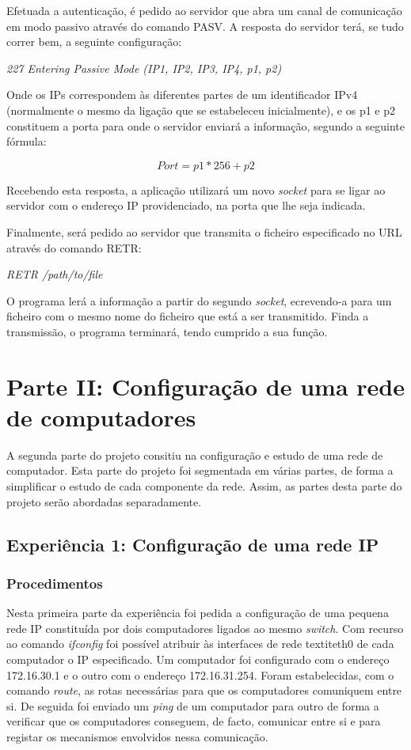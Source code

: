 \documentclass{article}
\begin{document}
Efetuada a autenticação, é pedido ao servidor que abra um canal de comunicação em modo passivo através do comando PASV. A resposta do servidor terá, se tudo correr bem, a seguinte configuração:

\textit{227 Entering Passive Mode (IP1, IP2, IP3, IP4, p1, p2)}

Onde os IPs correspondem às diferentes partes de um identificador IPv4 (normalmente o mesmo da ligação que se estabeleceu inicialmente), e os p1 e p2 constituem a porta para onde o servidor enviará a informação, segundo a seguinte fórmula:

\begin{equation}
Port = p1*256 + p2
\end{equation}

Recebendo esta resposta, a aplicação utilizará um novo \textit{socket} para se ligar ao servidor com o endereço IP providenciado, na porta que lhe seja indicada.

Finalmente, será pedido ao servidor que transmita o ficheiro especificado no URL através do comando RETR:

\textit{RETR /path/to/file}

O programa lerá a informação a partir do segundo \textit{socket}, ecrevendo-a para um ficheiro com o mesmo nome do ficheiro que está a ser transmitido. Finda a transmissão, o programa terminará, tendo cumprido a sua função.

\newpage

\section{Parte II: Configuração de uma rede de computadores}

A segunda parte do projeto consitiu na configuração e estudo de uma rede de computador. Esta parte do projeto foi segmentada em várias partes, de forma a simplificar o estudo de cada componente da rede. Assim, as partes desta parte do projeto serão abordadas separadamente.

\subsection{Experiência 1: Configuração de uma rede IP}

\subsubsection{Procedimentos}
Nesta primeira parte da experiência foi pedida a configuração de uma pequena rede IP constituída por dois computadores ligados ao mesmo \textit{switch}. Com recurso ao comando \textit{ifconfig} foi possível atribuir às interfaces de rede textit{eth0} de cada computador o IP especificado. Um computador foi configurado com o endereço 172.16.30.1 e o outro com o endereço 172.16.31.254. Foram estabelecidas, com o comando \textit{route}, as rotas necessárias para que os computadores comuniquem entre si.
De seguida foi enviado um \textit{ping} de um computador para outro de forma a verificar que os computadores conseguem, de facto, comunicar entre si e para registar os mecanismos envolvidos nessa comunicação. 
\end{document}
